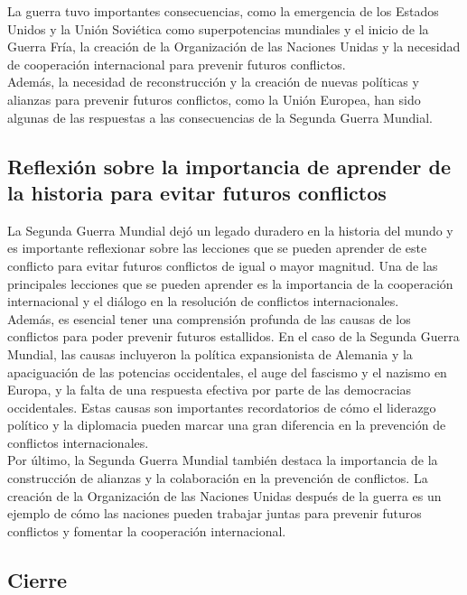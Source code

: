 \documentclass{article}
\theoremstyle{mytheoremstyle}
\theoremstyle{mytheoremstyle}
\theoremstyle{myproblemstyle}
\begin{document}
La guerra tuvo importantes consecuencias, como la emergencia de los Estados Unidos y la Unión Soviética como superpotencias mundiales y el inicio de la Guerra Fría, la creación de la Organización de las Naciones Unidas y la necesidad de cooperación internacional para prevenir futuros conflictos.\\

Además, la necesidad de reconstrucción y la creación de nuevas políticas y alianzas para prevenir futuros conflictos, como la Unión Europea, han sido algunas de las respuestas a las consecuencias de la Segunda Guerra Mundial.\\

\subsection{Reflexión sobre la importancia de aprender de la historia para evitar futuros conflictos}


La Segunda Guerra Mundial dejó un legado duradero en la historia del mundo y es importante reflexionar sobre las lecciones que se pueden aprender de este conflicto para evitar futuros conflictos de igual o mayor magnitud. Una de las principales lecciones que se pueden aprender es la importancia de la cooperación internacional y el diálogo en la resolución de conflictos internacionales.\\

Además, es esencial tener una comprensión profunda de las causas de los conflictos para poder prevenir futuros estallidos. En el caso de la Segunda Guerra Mundial, las causas incluyeron la política expansionista de Alemania y la apaciguación de las potencias occidentales, el auge del fascismo y el nazismo en Europa, y la falta de una respuesta efectiva por parte de las democracias occidentales. Estas causas son importantes recordatorios de cómo el liderazgo político y la diplomacia pueden marcar una gran diferencia en la prevención de conflictos internacionales.\\

Por último, la Segunda Guerra Mundial también destaca la importancia de la construcción de alianzas y la colaboración en la prevención de conflictos. La creación de la Organización de las Naciones Unidas después de la guerra es un ejemplo de cómo las naciones pueden trabajar juntas para prevenir futuros conflictos y fomentar la cooperación internacional.\\

\subsection{Cierre}
\end{document}

